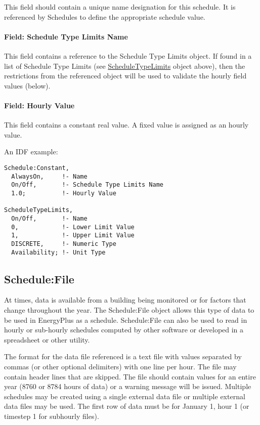 This field should contain a unique name designation for this schedule. It is referenced by Schedules to define the appropriate schedule value.

\paragraph{Field: Schedule Type Limits Name}\label{field-schedule-type-limits-name-5}

This field contains a reference to the Schedule Type Limits object. If found in a list of Schedule Type Limits (see \hyperref[scheduletypelimits]{ScheduleTypeLimits} object above), then the restrictions from the referenced object will be used to validate the hourly field values (below).

\paragraph{Field: Hourly Value}\label{field-hourly-value}

This field contains a constant real value. A fixed value is assigned as an hourly value.

An IDF example:

\begin{lstlisting}
Schedule:Constant,
  AlwaysOn,     !- Name
  On/Off,       !- Schedule Type Limits Name
  1.0;          !- Hourly Value

ScheduleTypeLimits,
  On/Off,       !- Name
  0,            !- Lower Limit Value
  1,            !- Upper Limit Value
  DISCRETE,     !- Numeric Type
  Availability; !- Unit Type
\end{lstlisting}

\subsection{Schedule:File}\label{schedulefile}

At times, data is available from a building being monitored or for factors that change throughout the year. The Schedule:File object allows this type of data to be used in EnergyPlus as a schedule. Schedule:File can also be used to read in hourly or sub-hourly schedules computed by other software or developed in a spreadsheet or other utility.

The format for the data file referenced is a text file with values separated by commas (or other optional delimiters) with one line per hour. The file may contain header lines that are skipped. The file should contain values for an entire year (8760 or 8784 hours of data) or a warning message will be issued. Multiple schedules may be created using a single external data file or multiple external data files may be used. The first row of data must be for January 1, hour 1 (or timestep 1 for subhourly files).

